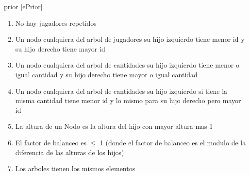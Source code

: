 \begin{Representacion}

	\begin{Estructura}{ prior }[ePrior]
		\begin{Tupla}[ePrior]
		\end{Tupla}
		\begin{Tupla}[Nodo]
		\end{Tupla}
	\end{Estructura}


	\begin{enumerate}
		
		\item No hay jugadores repetidos

		\item Un nodo cualquiera del arbol de jugadores su hijo izquierdo tiene menor id y su hijo derecho tiene mayor id

		\item Un nodo cualquiera del arbol de cantidades su hijo izquierdo tiene menor o igual cantidad y su hijo derecho tiene mayor o igual cantidad

		\item Un nodo cualquiera del arbol de cantidades su hijo izquierdo si tiene la misma cantidad tiene menor id y lo mismo para su hijo derecho pero mayor id

		\item La altura de un Nodo es la altura del hijo con mayor altura mas 1

		\item El factor de balanceo es $\leq$ 1 (donde el factor de balanceo es el modulo de la diferencia de las alturas de los hijos)

		\item Los arboles tienen los mismos elementos

	\end{enumerate}
	



\end{Representacion}
